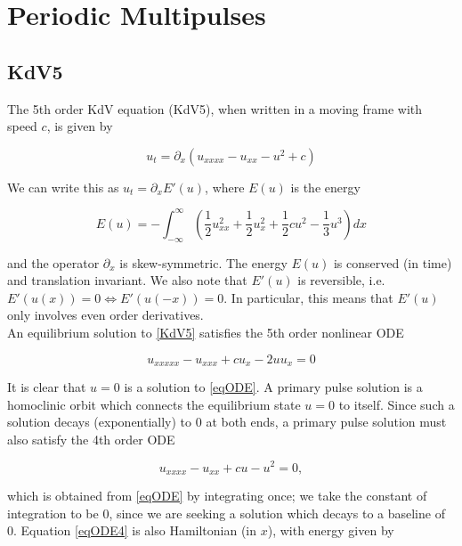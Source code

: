 \documentclass[12pt]{article}
\begin{document}
\section{Periodic Multipulses}

\subsection{KdV5}

The 5th order KdV equation (KdV5), when written in a moving frame with speed $c$, is given by

\begin{equation}\label{KdV5}
u_t = \partial_x(u_{xxxx} - u_{xx} - u^2 + c)
\end{equation}

We can write this as $u_t = \partial_x E'(u)$, where $E(u)$ is the energy

\begin{equation}\label{energy}
E(u) = -\int_{-\infty}^{\infty} \left( \frac{1}{2}u_{xx}^2 + \frac{1}{2}u_x^2 + \frac{1}{2}cu^2 - \frac{1}{3}u^3 \right) dx
\end{equation}

and the operator $\partial_x$ is skew-symmetric. The energy $E(u)$ is conserved (in time) and translation invariant. We also note that $E'(u)$ is reversible, i.e. $E'(u(x)) = 0 \iff E'(u(-x)) = 0$. In particular, this means that $E'(u)$ only involves even order derivatives.\\

An equilibrium solution to \eqref{KdV5} satisfies the 5th order nonlinear ODE

\begin{equation}\label{eqODE}
u_{xxxxx} - u_{xxx} + c u_x - 2 u u_x = 0
\end{equation}

It is clear that $u = 0$ is a solution to \eqref{eqODE}. A primary pulse solution is a homoclinic orbit which connects the equilibrium state $u = 0$ to itself. Since such a solution decays (exponentially) to 0 at both ends, a primary pulse solution must also satisfy the 4th order ODE

\begin{equation}\label{eqODE4}
u_{xxxx} - u_{xx} + c u - u^2 = 0,
\end{equation}

which is obtained from \eqref{eqODE} by integrating once; we take the constant of integration to be 0, since we are seeking a solution which decays to a baseline of 0. Equation \eqref{eqODE4} is also Hamiltonian (in $x$), with energy given by
\end{document}
